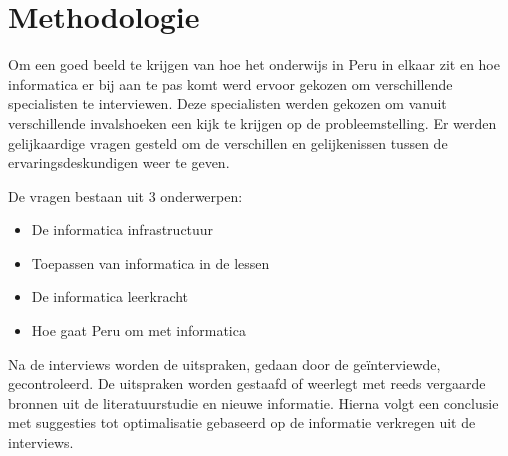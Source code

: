 
\chapter{Methodologie}
\label{ch:methodologie}


Om een goed beeld te krijgen van hoe het onderwijs in Peru in elkaar zit en hoe informatica er bij aan te pas komt werd ervoor gekozen om verschillende specialisten te interviewen. Deze specialisten werden gekozen om vanuit verschillende invalshoeken een kijk te krijgen op de probleemstelling. Er werden gelijkaardige vragen gesteld om de verschillen en gelijkenissen tussen de ervaringsdeskundigen weer te geven.

De vragen bestaan uit 3 onderwerpen: 

\begin{itemize}
	\item De informatica infrastructuur
	\item Toepassen van informatica in de lessen
	\item De informatica leerkracht
	\item Hoe gaat Peru om met informatica
\end{itemize}

Na de interviews worden de uitspraken, gedaan door de geïnterviewde, gecontroleerd. De uitspraken worden gestaafd of weerlegt met reeds vergaarde bronnen uit de literatuurstudie en nieuwe informatie. Hierna volgt een conclusie met suggesties tot optimalisatie gebaseerd op de informatie verkregen uit de interviews.


